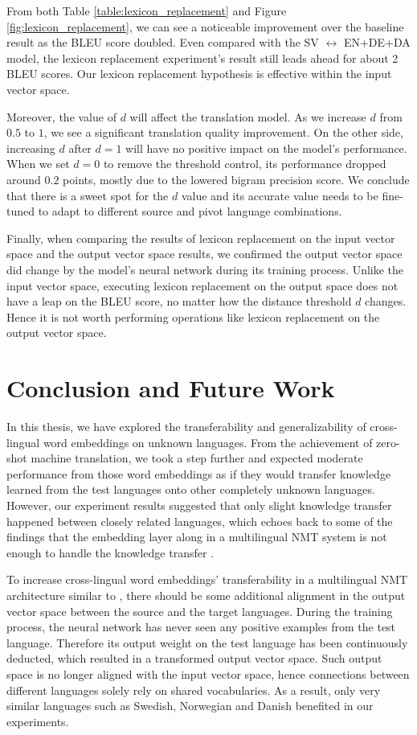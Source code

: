 \documentclass[thesis,fonts=libertine]{cluu}
\begin{document}
From both Table \ref{table:lexicon_replacement} and Figure \ref{fig:lexicon_replacement}, we can see a noticeable improvement over the baseline result as the BLEU score doubled. Even compared with the SV $\leftrightarrow$ EN+DE+DA model, the lexicon replacement experiment's result still leads ahead for about 2 BLEU scores. Our lexicon replacement hypothesis is effective within the input vector space.

Moreover, the value of $d$ will affect the translation model. As we increase $d$ from $0.5$ to $1$, we see a significant translation quality improvement. On the other side, increasing $d$ after $d=1$ will have no positive impact on the model's performance. When we set $d=0$ to remove the threshold control, its performance dropped around $0.2$ points, mostly due to the lowered bigram precision score. We conclude that there is a sweet spot for the $d$ value and its accurate value needs to be fine-tuned to adapt to different source and pivot language combinations.

Finally, when comparing the results of lexicon replacement on the input vector space and the output vector space results, we confirmed the output vector space did change by the model's neural network during its training process. Unlike the input vector space, executing lexicon replacement on the output space does not have a leap on the BLEU score, no matter how the distance threshold $d$ changes. Hence it is not worth performing operations like lexicon replacement on the output vector space.

\chapter{Conclusion and Future Work}
\label{chap:conclusion}

In this thesis, we have explored the transferability and generalizability of cross-lingual word embeddings on unknown languages. From the achievement of zero-shot machine translation, we took a step further and expected moderate performance from those word embeddings as if they would transfer knowledge learned from the test languages onto other completely unknown languages. However, our experiment results suggested that only slight knowledge transfer happened between closely related languages, which echoes back to some of the findings that the embedding layer along in a multilingual NMT system is not enough to handle the knowledge transfer \parencite{aji-etal-2020-neural}.

To increase cross-lingual word embeddings' transferability in a multilingual NMT architecture similar to \textcite{Johnson:2016aa}, there should be some additional alignment in the output vector space between the source and the target languages. During the training process, the neural network has never seen any positive examples from the test language. Therefore its output weight on the test language has been continuously deducted, which resulted in a transformed output vector space. Such output space is no longer aligned with the input vector space, hence connections between different languages solely rely on shared vocabularies. As a result, only very similar languages such as Swedish, Norwegian and Danish benefited in our experiments.
\end{document}
